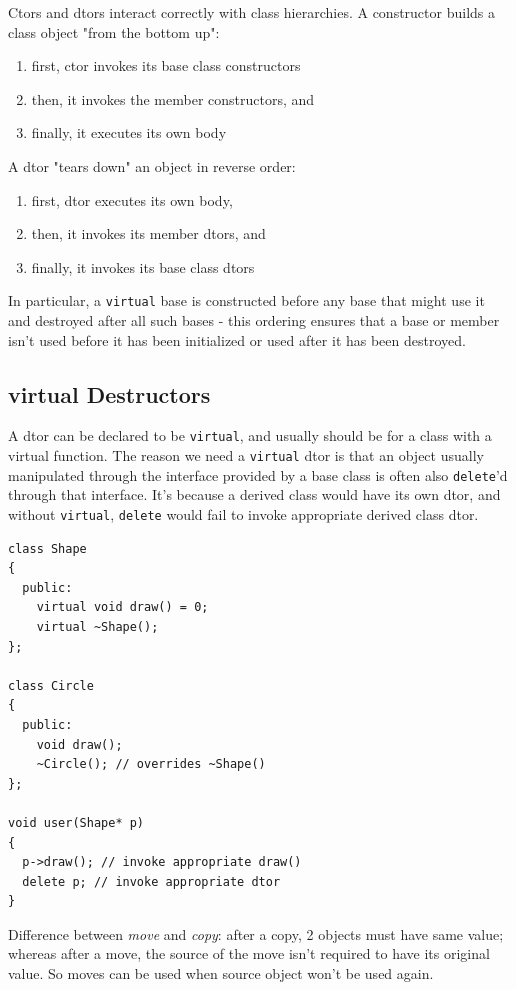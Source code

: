 \documentclass[10pt]{amsart}
\begin{document}
\begin{multicols*}{2}
Ctors and dtors interact correctly with class hierarchies. A constructor builds a class object "from the bottom up":
\begin{enumerate}
	\item first, ctor invokes its base class constructors
	\item then, it invokes the member constructors, and
	\item finally, it executes its own body
\end{enumerate}
A dtor "tears down" an object in reverse order:
\begin{enumerate}
	\item first, dtor executes its own body,
	\item then, it invokes its member dtors, and
	\item finally, it invokes its base class dtors
\end{enumerate}

In particular, a \verb|virtual| base is constructed before any base that might use it and destroyed after all such bases - this ordering ensures that a base or member isn't used before it has been initialized or used after it has been destroyed.

\subsection{virtual Destructors}

A dtor can be declared to be \verb|virtual|, and usually should be for a class with a virtual function. The reason we need a \verb|virtual| dtor is that an object usually manipulated through the interface provided by a base class is often also \verb|delete|'d through that interface. It's because a derived class would have its own dtor, and without \verb|virtual|, \verb|delete| would fail to invoke appropriate derived class dtor.

\begin{lstlisting}
class Shape
{
  public:
    virtual void draw() = 0;
    virtual ~Shape();
};

class Circle
{
  public:
	void draw();
	~Circle(); // overrides ~Shape()
};

void user(Shape* p)
{
  p->draw(); // invoke appropriate draw()
  delete p; // invoke appropriate dtor
}
\end{lstlisting}


Difference between \emph{move} and \emph{copy}: after a copy, 2 objects must have same value; whereas after a move, the source of the move isn't required to have its original value.  So moves can be used when source object won't be used again.  


\end{multicols*}
\end{document}
